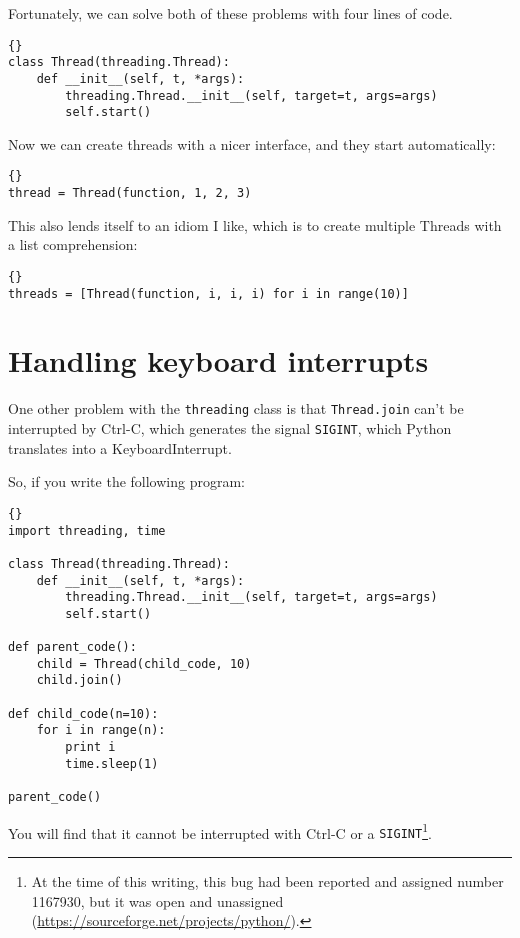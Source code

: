 \documentclass{book}
\begin{document}
Fortunately, we can solve both of these problems with four
lines of code.

\begin{lstlisting}[title={Cleaned-up Thread class}]{}
class Thread(threading.Thread):
    def __init__(self, t, *args):
        threading.Thread.__init__(self, target=t, args=args)
        self.start()
\end{lstlisting}

Now we can create threads with a nicer interface, and they
start automatically:

\begin{lstlisting}[title={Thread example (my way)}]{}
thread = Thread(function, 1, 2, 3)
\end{lstlisting}

This also lends itself to an idiom I like, which is to create
multiple Threads with a list comprehension:

\begin{lstlisting}[title={Multiple thread example}]{}
threads = [Thread(function, i, i, i) for i in range(10)]
\end{lstlisting}

\section{Handling keyboard interrupts}

One other problem with the {\tt threading} class is that 
{\tt Thread.join} can't be interrupted by Ctrl-C, which
generates the signal {\tt SIGINT}, which Python translates
into a KeyboardInterrupt.

\newpage
So, if you write the following program:

\begin{lstlisting}[title={Unstoppable program}]{}
import threading, time

class Thread(threading.Thread):
    def __init__(self, t, *args):
        threading.Thread.__init__(self, target=t, args=args)
        self.start()

def parent_code():
    child = Thread(child_code, 10)
    child.join()

def child_code(n=10):
    for i in range(n):
        print i
        time.sleep(1)
    
parent_code()
\end{lstlisting}

You will find that it cannot be interrupted with Ctrl-C or
a {\tt SIGINT}\footnote{At the time of this writing, this
bug had been reported and assigned number 1167930, but it was
open and unassigned (\url{https://sourceforge.net/projects/python/}).}.
\end{document}

